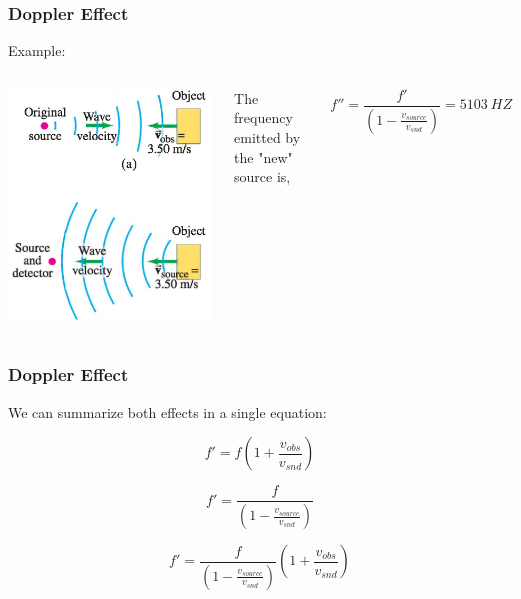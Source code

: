 \documentclass[]{beamer}
\begin{document}
\begin{frame}
\frametitle{Doppler Effect}

Example: 

\vspace{3mm}

   \begin{columns}[c]
   \column{2in}  %
  \begin{center}
  \includegraphics[height=2.in]{images4/doppler7.jpg}
\end{center}


  
   \column{2in}


The frequency emitted by the "new" source is,

\begin{equation*}
f''=\frac{f'}{(1-\frac{v_{source}}{v_{snd}})}=5103~HZ
\end{equation*}

   \end{columns}




  \end{frame}



\begin{frame}
\frametitle{Doppler Effect}

We can summarize both effects in a single equation:

\begin{equation*}
f'= f\left(1+\frac{v_{obs}}{v_{snd}}\right)
\end{equation*}


\begin{equation*}
f'=\frac{f}{(1-\frac{v_{source}}{v_{snd}})}
\end{equation*}

\begin{equation}
f'= \frac{f}{(1-\frac{v_{source}}{v_{snd}})}\left(1+\frac{v_{obs}}{v_{snd}}\right)
\end{equation}


  \end{frame}
\end{document}
